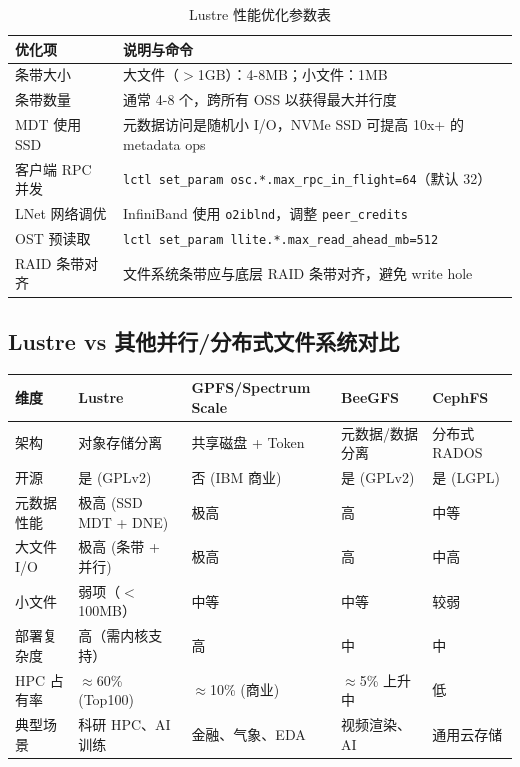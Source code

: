 \documentclass[12pt,UTF8]{ctexbook}
\begin{document}
\begin{table}[h]
\centering
\caption{Lustre 性能优化参数表}
\begin{tabular}{|p{4.5cm}|p{7.5cm}|}
\hline
\textbf{优化项} & \textbf{说明与命令} \\
\hline
条带大小 & 大文件（$>$1GB）：4-8MB；小文件：1MB \\
\hline
条带数量 & 通常 4-8 个，跨所有 OSS 以获得最大并行度 \\
\hline
MDT 使用 SSD & 元数据访问是随机小 I/O，NVMe SSD 可提高 10x+ 的 metadata ops \\
\hline
客户端 RPC 并发 & \texttt{lctl set\_param osc.*.max\_rpc\_in\_flight=64}（默认 32） \\
\hline
LNet 网络调优 & InfiniBand 使用 \texttt{o2iblnd}，调整 \texttt{peer\_credits} \\
\hline
OST 预读取 & \texttt{lctl set\_param llite.*.max\_read\_ahead\_mb=512} \\
\hline
RAID 条带对齐 & 文件系统条带应与底层 RAID 条带对齐，避免 write hole \\
\hline
\end{tabular}
\end{table}

\subsection{Lustre vs 其他并行/分布式文件系统对比}

\begin{tabular}{|p{2cm}|p{2.5cm}|p{2.5cm}|p{2.5cm}|p{2.5cm}|}
\hline
\textbf{维度} & \textbf{Lustre} & \textbf{GPFS/Spectrum Scale} & \textbf{BeeGFS} & \textbf{CephFS} \\
\hline
架构 & 对象存储分离 & 共享磁盘 + Token & 元数据/数据分离 & 分布式 RADOS \\
\hline
开源 & 是 (GPLv2) & 否 (IBM 商业) & 是 (GPLv2) & 是 (LGPL) \\
\hline
元数据性能 & 极高 (SSD MDT + DNE) & 极高 & 高 & 中等 \\
\hline
大文件 I/O & 极高 (条带 + 并行) & 极高 & 高 & 中高 \\
\hline
小文件 & 弱项（$<$100MB） & 中等 & 中等 & 较弱 \\
\hline
部署复杂度 & 高（需内核支持） & 高 & 中 & 中 \\
\hline
HPC 占有率 & $\approx$60\% (Top100) & $\approx$10\% (商业) & $\approx$5\% 上升中 & 低 \\
\hline
典型场景 & 科研 HPC、AI 训练 & 金融、气象、EDA & 视频渲染、AI & 通用云存储 \\
\hline
\end{tabular}
\end{document}
